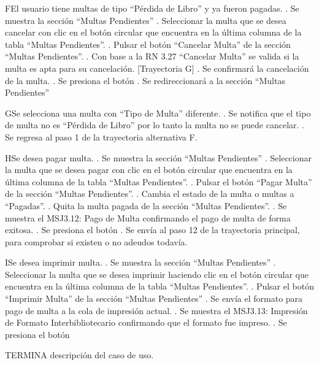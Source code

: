 		\begin{UCtrayectoriaA}{F}{El usuario tiene multas de tipo “Pérdida de Libro” y ya fueron pagadas.}
			.	Se muestra la sección “Multas Pendientes”
			.	Seleccionar la multa que se desea cancelar con clic en el botón circular que encuentra en la última columna de la tabla “Multas Pendientes”.  
			.	Pulsar el botón “Cancelar Multa” de la sección “Multas Pendientes”.
			.	Con base a la RN 3.27 “Cancelar Multa” se valida si la multa es apta para su cancelación. [Trayectoria G]
			.	Se confirmará la cancelación de la multa.
			. Se presiona el botón 
			.	Se redireccionará a la sección “Multas Pendientes” 
		\end{UCtrayectoriaA}
		\begin{UCtrayectoriaA}{G}{Se selecciona una multa con “Tipo de Multa” diferente.}
			.	Se notifica que el tipo de multa no es “Pérdida de Libro” por lo tanto la multa no se puede cancelar.
			.	Se regresa al paso 1 de la trayectoria alternativa F.
		\end{UCtrayectoriaA}
		\begin{UCtrayectoriaA}{H}{Se desea pagar multa.}
			.	Se muestra la sección “Multas Pendientes”
			.	Seleccionar la multa que se desea pagar con clic en el botón circular que encuentra en la última columna de la tabla “Multas Pendientes”.  
			.	Pulsar el botón “Pagar Multa” de la sección “Multas Pendientes”. 
			.	Cambia el estado de la multa o multas a “Pagadas”.
			.	Quita la multa pagada de la sección “Multas Pendientes”.
			.	Se muestra el MSJ3.12: Pago de Multa confirmando el pago de multa de forma exitosa.
			. Se presiona el botón 
			.	Se envía al paso 12 de la trayectoria principal, para comprobar si existen o no adeudos todavía. 
		\end{UCtrayectoriaA}
		\begin{UCtrayectoriaA}{I}{Se desea imprimir multa.}
			.	Se muestra la sección “Multas Pendientes”
			.	Seleccionar la multa que se desea imprimir haciendo clic en el botón circular que encuentra en la última columna de la tabla “Multas Pendientes”. 
			.	Pulsar el botón “Imprimir Multa” de la sección “Multas Pendientes”
			.	Se envía el formato para pago de multa a la cola de impresión actual.
			.	Se muestra el MSJ3.13: Impresión de Formato Interbibliotecario confirmando que el formato fue impreso.
			. Se presiona el botón 
		\end{UCtrayectoriaA}
		
TERMINA descripción del caso de uso.